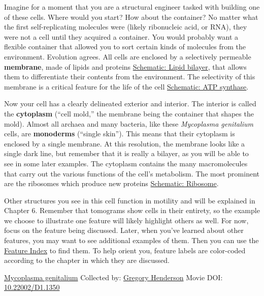 \documentclass[]{tufte-book}
\begin{document}
Imagine for a moment that you are a structural engineer tasked with building one of these cells. Where would you start? How about the container? No matter what the first self-replicating molecules were (likely ribonucleic acid, or RNA), they were not a cell until they acquired a container. You would probably want a flexible container that allowed you to sort certain kinds of molecules from the environment. Evolution agrees. All cells are enclosed by a selectively permeable \textbf{membrane}, made of lipids and proteins \protect\hyperlink{Lipid_bilayer}{Schematic: Lipid bilayer}, that allows them to differentiate their contents from the environment. The selectivity of this membrane is a critical feature for the life of the cell \protect\hyperlink{ATP_synthase_and_energy_production}{Schematic: ATP synthase}.

Now your cell has a clearly delineated exterior and interior. The interior is called the \textbf{cytoplasm} (``cell mold,'' the membrane being the container that shapes the mold). Almost all archaea and many bacteria, like these \emph{Mycoplasma genitalium} cells, are \textbf{monoderms} (``single skin''). This means that their cytoplasm is enclosed by a single membrane. At this resolution, the membrane looks like a single dark line, but remember that it is really a bilayer, as you will be able to see in some later examples. The cytoplasm contains the many macromolecules that carry out the various functions of the cell's metabolism. The most prominent are the ribosomes which produce new proteins \protect\hyperlink{Ribosome}{Schematic: Ribosome}.

Other structures you see in this cell function in motility and will be explained in Chapter 6. Remember that tomograms show cells in their entirety, so the example we choose to illustrate one feature will likely highlight others as well. For now, focus on the feature being discussed. Later, when you've learned about other features, you may want to see additional examples of them. Then you can use the \protect\hyperlink{feature-index}{Feature Index} to find them. To help orient you, feature labels are color-coded according to the chapter in which they are discussed.



\hypertarget{htmlwidget-72a083696cb681a76492}{}

\label{fig:2-1}\protect\hyperlink{tree}{Mycoplasma genitalium} Collected by: \protect\hyperlink{gregory_henderson}{Gregory Henderson} Movie DOI: \href{https://doi.org/10.22002/D1.1350}{10.22002/D1.1350}
\end{document}

